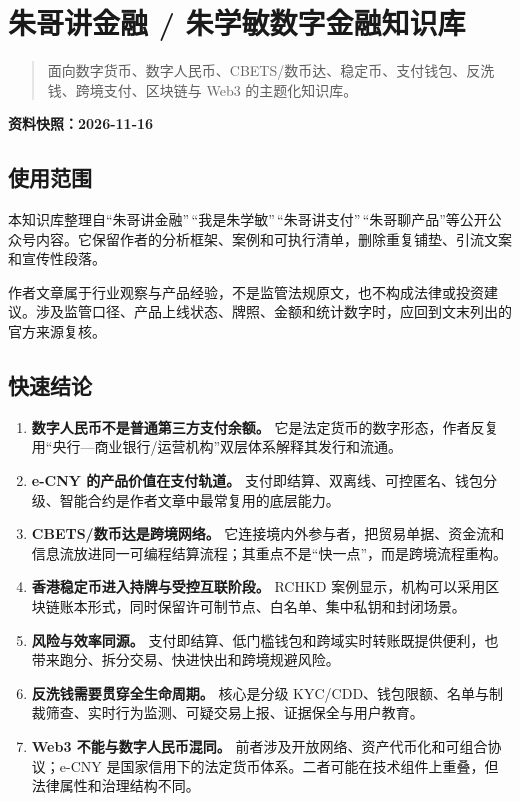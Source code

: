 \chapter{朱哥讲金融 /
朱学敏数字金融知识库}\label{ux6731ux54e5ux8bb2ux91d1ux878d--ux6731ux5b66ux654fux6570ux5b57ux91d1ux878dux77e5ux8bc6ux5e93}

\begin{quote}
面向数字货币、数字人民币、CBETS/数币达、稳定币、支付钱包、反洗钱、跨境支付、区块链与
Web3 的主题化知识库。
\end{quote}

\textbf{资料快照：2026-11-16}

\section{使用范围}\label{ux4f7fux7528ux8303ux56f4}

本知识库整理自``朱哥讲金融''\,``我是朱学敏''\,``朱哥讲支付''\,``朱哥聊产品''等公开公众号内容。它保留作者的分析框架、案例和可执行清单，删除重复铺垫、引流文案和宣传性段落。

作者文章属于行业观察与产品经验，不是监管法规原文，也不构成法律或投资建议。涉及监管口径、产品上线状态、牌照、金额和统计数字时，应回到文末列出的官方来源复核。

\section{快速结论}\label{ux5febux901fux7ed3ux8bba}

\begin{enumerate}
\def\labelenumi{\arabic{enumi}.}
\tightlist
\item
  \textbf{数字人民币不是普通第三方支付余额。}
  它是法定货币的数字形态，作者反复用``央行---商业银行/运营机构''双层体系解释其发行和流通。
\item
  \textbf{e-CNY 的产品价值在支付轨道。}
  支付即结算、双离线、可控匿名、钱包分级、智能合约是作者文章中最常复用的底层能力。
\item
  \textbf{CBETS/数币达是跨境网络。}
  它连接境内外参与者，把贸易单据、资金流和信息流放进同一可编程结算流程；其重点不是``快一点''，而是跨境流程重构。
\item
  \textbf{香港稳定币进入持牌与受控互联阶段。} RCHKD
  案例显示，机构可以采用区块链账本形式，同时保留许可制节点、白名单、集中私钥和封闭场景。
\item
  \textbf{风险与效率同源。}
  支付即结算、低门槛钱包和跨域实时转账既提供便利，也带来跑分、拆分交易、快进快出和跨境规避风险。
\item
  \textbf{反洗钱需要贯穿全生命周期。} 核心是分级
  KYC/CDD、钱包限额、名单与制裁筛查、实时行为监测、可疑交易上报、证据保全与用户教育。
\item
  \textbf{Web3 不能与数字人民币混同。}
  前者涉及开放网络、资产代币化和可组合协议；e-CNY
  是国家信用下的法定货币体系。二者可能在技术组件上重叠，但法律属性和治理结构不同。
\end{enumerate}

